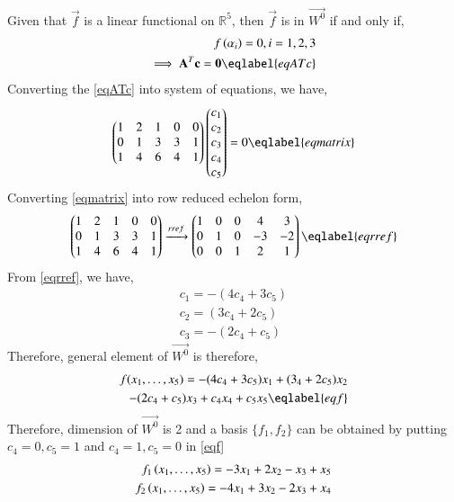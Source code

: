 \documentclass[journal,12pt,twocolumn]{IEEEtran}
\begin{document}
Given that $\vec{f}$ is a linear functional on $\mathbb{R}^5$, then $\vec{f}$ is in $\vec{W^0}$ if and only if,
\begin{align}
    f\brak{\alpha_i}=0, i=1,2,3\\
    \implies \vec{A}^T\vec{c}=\vec{0}\eqlabel{eqATc}
\end{align}
Converting the \eqref{eqATc} into system of equations, we have,
\begin{align}
    \myvec{1&2&1&0&0\\0&1&3&3&1\\1&4&6&4&1}\myvec{c_1\\c_2\\c_3\\c_4\\c_5}=0\eqlabel{eqmatrix}
\end{align}
Converting \eqref{eqmatrix} into row reduced echelon form,
\begin{align}
     \myvec{1&2&1&0&0\\0&1&3&3&1\\1&4&6&4&1}\xrightarrow[]{rref}\myvec{1&0&0&4&3\\0&1&0&-3&-2\\0&0&1&2&1}\eqlabel{eqrref}
\end{align}
From \eqref{eqrref}, we have,
\begin{align}
    c_1=-(4c_4+3c_5)\\
    c_2=(3c_4+2c_5)\\
    c_3=-(2c_4+c_5)
\end{align}
Therefore, general element of $\vec{W^0}$ is therefore,
\begin{multline}
\begin{aligned}
f(x_1,\dots,x_5)=-(4c_4+3c_5)x_1+(3_4+2c_5)x_2\\
-(2c_4+c_5)x_3+c_4x_4+c_5x_5 \eqlabel{eqf}
\end{aligned}
\end{multline}
Therefore, dimension of $\vec{W^0}$ is 2 and a basis $\{f_1,f_2\}$ can be obtained by putting $c_4=0,c_5=1$ and $c_4=1,c_5=0$ in \eqref{eqf}
\begin{align}
    f_1\left(x_1,\dots,x_5\right)=-3x_1+2x_2-x_3+x_5\\
    f_2\left(x_1,\dots,x_5\right)=-4x_1+3x_2-2x_3+x_4
\end{align}
\end{document}
